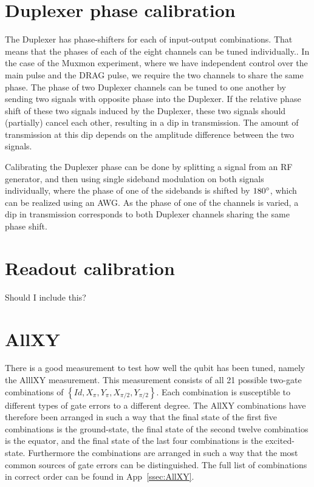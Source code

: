     \section{Duplexer phase calibration}
      \label{sec:Duplexer phase calibration}
      The Duplexer has phase-shifters for each of input-output combinations. That means that the phases of each of the eight channels can be tuned individually.. In the case of the Muxmon experiment, where we have independent control over the main pulse and the DRAG pulse, we require the two channels to share the same phase. The phase of two Duplexer channels can be tuned to one another by sending two signals with opposite phase into the Duplexer. If the relative phase shift of these two signals induced by the Duplexer, these two signals should (partially) cancel each other, resulting in a dip in transmission. The amount of transmission at this dip depends on the amplitude difference between the two signals.

      Calibrating the Duplexer phase can be done by splitting a signal from an RF generator, and then using single sideband modulation on both signals individually, where the phase of one of the sidebands is shifted by $180 \degree$, which can be realized using an AWG. As the phase of one of the channels is varied, a dip in transmission corresponds to both Duplexer channels sharing the same phase shift.

    \section{Readout calibration}
      \label{sec:Readout calibration}
      Should I include this?

    \section{AllXY}
      \label{sec:AllXY}
        There is a good measurement to test how well the qubit has been tuned, namely the AlllXY measurement. This measurement consists of all 21 possible two-gate combinations of $\left\{Id, X_{\pi}, Y_{\pi}, X_{\pi/2}, Y_{\pi/2}\right\}$. Each combination is susceptible to different types of gate errors to a different degree. The AllXY combinations have therefore been arranged in such a way that the final state of the first five combinations is the ground-state, the final state of the second twelve combinatios is the equator, and the final state of the last four combinations is the excited-state. Furthermore the combinations are arranged in such a way that the most common sources of gate errors can be distinguished. The full list of combinations in correct order can be found in App~\ref{ssec:AllXY}.

